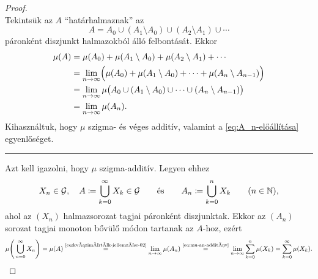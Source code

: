 \documentclass[
]{elteikthesis}[2024/04/26]
\begin{document}
	\begin{proof}\,\\[1pt]
		\fbox{\ref{eq:kvázimérték-jellemzése-01} \( \Longrightarrow \)
			  \ref{eq:kvázimérték-jellemzése-02}}
		Tekintsük az \( A \) ``határhalmaznak'' az
		\[
			A = A_0 \cup (A_1 \setminus A_0) \cup (A_2 \setminus A_1) \cup \cdots
		\]
		páronként diszjunkt halmazokból álló felbontását. Ekkor
		\begin{align*}
			\mu(A)
			&= \mu(A_0) + \mu(A_1 \setminus A_0) + \mu(A_2 \setminus A_1) + \cdots \\
			&= \lim_{n \to \infty} \Bigl( 
			\mu(A_0) + \mu(A_1 \setminus A_0) + \cdots + \mu(A_n \setminus A_{n-1})
			\Bigr)\\
			&= \lim_{n \to \infty} \mu \bigl( 
			A_0 \cup (A_1 \setminus A_0) \cup \cdots \cup (A_n \setminus A_{n-1})
			\bigr) \\
			&= \lim_{n \to \infty} \mu (A_n).
		\end{align*}
		Kihasználtuk, hogy \( \mu \) szigma- és véges additív, 
		valamint a \eqref{eq:A_n-előállítása} egyenlőséget.
		
		\vspace{3pt}
		\hrule
		\vspace{6pt}
		
		\fbox{\ref{eq:kvázimérték-jellemzése-02} \( \Longrightarrow \)
			  \ref{eq:kvázimérték-jellemzése-01}}
		Azt kell igazolni, hogy \( \mu \) szigma-additív. Legyen ehhez
		\[
			X_n \in \mathcal{G}, \quad
			A \coloneq \bigcup_{k=0}^{\infty} X_k \in \mathcal{G} \qquad \text{és} \qquad
			A_n \coloneq \bigcup_{k=0}^{n} X_k \qquad (n \in \mathbb{N}),
		\]
		ahol az \( (X_n) \) halmazsorozat tagjai páronként diszjunktak. 
		Ekkor az \( (A_n) \) sorozat tagjai monoton bővülő módon tartanak az \( A \)-hoz,
		ezért
		\[
			\mu \Biggl( \, \bigcup_{n=0}^{\infty} X_n \Biggr) =
			\mu (A) \overset{\text{\ref{eq:kvázimérték-jellemzése-02}}}{=}
			\lim_{n \to \infty} \mu( A_n ) \overset{\text{\ref{eq:mu-an-additív}}}{=}
			\lim_{n \to \infty} \sum_{k=0}^{n} \mu( X_k ) =
			\sum_{k=0}^{\infty} \mu( X_k ).
		\]
		

\end{proof}
\end{document}

